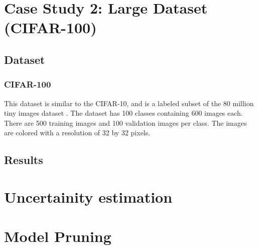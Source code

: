 \section{Case Study 2: Large Dataset (CIFAR-100)}
\subsection{Dataset}

\subsubsection{CIFAR-100}
This dataset is similar to the CIFAR-10, and is a labeled subset of the 80 million tiny images dataset \cite{Torralba:2008:MTI:1444381.1444403}. The dataset has 100 classes containing 600 images each. There are 500 training images and 100 validation images per class. The images are colored with a resolution of 32 by 32 pixels.

\subsection{Results}

\section{Uncertainity estimation}
\section{Model Pruning}

\ifpdf
    \graphicspath{{Chapter2/Figs/Raster/}{Chapter2/Figs/PDF/}{Chapter2/Figs/}}
\else
    \graphicspath{{Chapter2/Figs/Vector/}{Chapter2/Figs/}}
\fi


